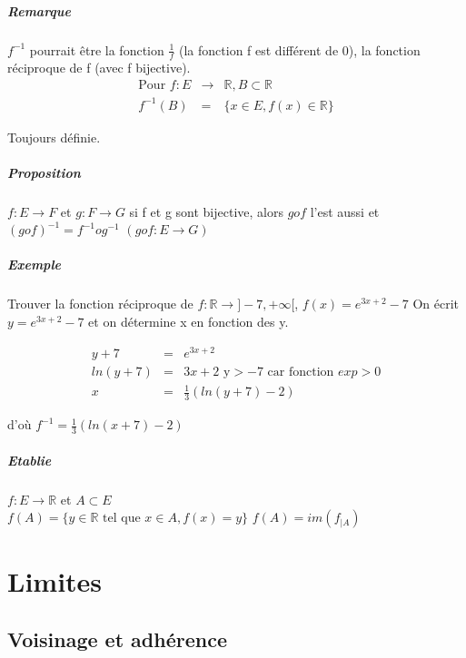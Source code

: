 \paragraph{Remarque} $f^{-1}$ pourrait être la fonction $\frac{1}{f}$ (la fonction f est différent de 0), la fonction réciproque de f (avec f bijective).
\[\begin{array}{rcl}
	\text{Pour } f : E & \rightarrow & \mathbb{R}, B \subset \mathbb{R} \\
	f^{-1}(B) & = & \{x \in E, f(x) \in \mathbb{R}\}
\end{array}\]

Toujours définie.

\paragraph{Proposition} $ f : E \rightarrow F$ et $g:F \rightarrow G$
si f et g sont bijective, alors $gof$ l'est aussi et $(gof)^{-1} = f^{-1}og^{-1}$ $(gof : E \rightarrow G)$

\paragraph{Exemple} Trouver la fonction réciproque de $f : \mathbb{R} \rightarrow ]-7, +\infty[ $, $f(x) = e^{3x+2} - 7$
On écrit $y = e^{3x+2}-7$ et on détermine x en fonction des y.

\[\begin{array}{rcl}
	y + 7 & = & e^{3x+2} \\
	ln(y+7) & = & 3x + 2  \text{ y} > -7 \text{ car fonction } exp > 0\\
	x &=& \frac{1}{3}(ln(y+7)-2)
\end{array}\]

d'où $f^{-1} = \frac{1}{3}(ln(x+7)-2)$

\paragraph{Etablie} $f : E \rightarrow \mathbb{R}$ et $A \subset E$ ~\\
$f(A) = \{y \in \mathbb{R} \text{ tel que } x \in A, f(x) = y\}$
$f(A) = im(f_{|A})$

\chapter{Limites}

\section{Voisinage et adhérence}
